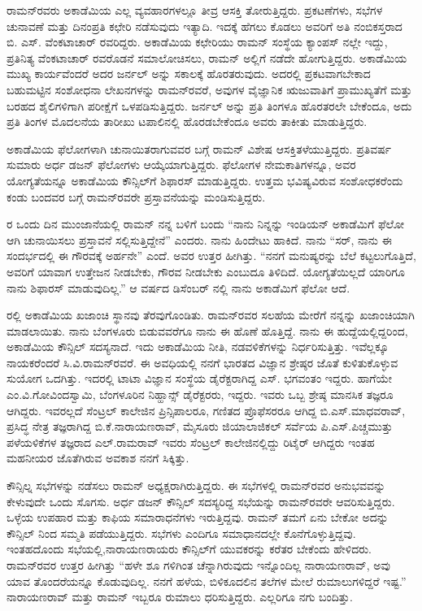 ರಾಮನ್‍ರವರು ಅಕಾಡೆಮಿಯ ಎಲ್ಲ ವ್ಯವಹಾರಗಳಲ್ಲೂ ತೀವ್ರ ಆಸಕ್ತಿ ತೋರುತ್ತಿದ್ದರು. ಪ್ರಕಟಣೆಗಳು, ಸಭೆಗಳ ಚುನಾವಣೆ ಮತ್ತು ದಿನಂಪ್ರತಿ ಕಛೇರಿ ನಡೆಸುವುದು ಇತ್ಯಾದಿ. ಇದಕ್ಕೆ ಹೆಗಲು ಕೊಡಲು ಅವರಿಗೆ ಅತಿ ನಂಬಿಕಸ್ತರಾದ ಬಿ. ಎಸ್. ವೆಂಕಟಾಚಾರ್ ರವರಿದ್ದರು. ಅಕಾಡೆಮಿಯ ಕಛೇರಿಯು ರಾಮನ್ ಸಂಸ್ಥೆಯ ಕ್ಯಾಂಪಸ್ ನಲ್ಲೇ ಇದ್ದು, ಪ್ರತಿನಿತ್ಯ ವೆಂಕಟಾಚಾರ್ ರವರೊಡನೆ ಸಮಾಲೋಚಿಸಲು, ರಾಮನ್ ಅಲ್ಲಿಗೆ ನಡೆದೇ ಹೋಗುತ್ತಿದ್ದರು. ಅಕಾಡೆಮಿಯ ಮುಖ್ಯ ಕಾರ್ಯವೆಂದರೆ ಅದರ ಜರ್ನಲ್  ಅನ್ನು ಸಕಾಲಕ್ಕೆ ಹೊರತರುವುದು. ಅದರಲ್ಲಿ ಪ್ರಕಟವಾಗಬೇಕಾದ ಬಹುಮಟ್ಟಿನ ಸಂಶೋಧನಾ ಲೇಖನಗಳನ್ನು ರಾಮನ್‍ರವರೆ, ಅವುಗಳ ವೈಜ್ಞಾನಿಕ ಋಜುವಾತಿಗೆ ಪ್ರಾಮುಖ್ಯತೆಗೆ ಮತ್ತು ಬರಹದ ಶೈಲಿಗಳಿಗಾಗಿ ಪರೀಕ್ಷೆಗೆ ಒಳಪಡಿಸುತ್ತಿದ್ದರು. ಜರ್ನಲ್ ಅನ್ನು ಪ್ರತಿ ತಿಂಗಳೂ ಹೊರತರಲೇ ಬೇಕೆಂದೂ, ಅದು ಪ್ರತಿ ತಿಂಗಳ ಮೊದಲನೆಯ ತಾರೀಖು ಟಪಾಲಿನಲ್ಲಿ ಹೊರಡಬೇಕೆಂದೂ ಅವರು ತಾಕೀತು ಮಾಡುತ್ತಿದ್ದರು.

ಅಕಾಡೆಮಿಯ ಫೆಲೋಗಳಾಗಿ ಚುನಾಯಿತರಾಗುವವರ ಬಗ್ಗೆ ರಾಮನ್ ವಿಶೇಷ ಆಸಕ್ತಿ\break ತಳೆಯುತ್ತಿದ್ದರು. ಪ್ರತಿವರ್ಷ ಸುಮಾರು ಅರ್ಧ ಡಜನ್ ಫೆಲೋಗಳು ಆಯ್ಕೆಯಾಗುತ್ತಿದ್ದರು. ಫೆಲೋಗಳ ನೇಮಕಾತಿಗಳನ್ನೂ, ಅವರ ಯೋಗ್ಯತೆಯನ್ನೂ ಅಕಾಡೆಮಿಯ ಕೌನ್ಸಿಲ್‍ಗೆ ಶಿಫಾರಸ್ ಮಾಡುತ್ತಿದ್ದರು. ಉತ್ತಮ ಭವಿಷ್ಯವಿರುವ ಸಂಶೋಧಕರೆಂದು ಕಂಡು ಬಂದವರ ಬಗ್ಗೆ ರಾಮನ್‍ರವರೇ ಪ್ರಸ್ತಾವನೆಯನ್ನು ಮಂಡಿಸುತ್ತಿದ್ದರು.

ರ ಒಂದು ದಿನ ಮುಂಜಾನೆಯಲ್ಲಿ ರಾಮನ್ ನನ್ನ ಬಳಿಗೆ ಬಂದು \enginline{-} “ನಾನು ನಿನ್ನನ್ನು ಇಂಡಿಯನ್ ಅಕಾಡೆಮಿಗೆ ಫೆಲೋ ಆಗಿ ಚುನಾಯಿಸಲು ಪ್ರಸ್ತಾವನೆ ಸಲ್ಲಿಸುತ್ತಿದ್ದೇನೆ” ಎಂದರು. ನಾನು ಹಿಂದೇಟು ಹಾಕಿದೆ. ನಾನು “ಸರ್, ನಾನು ಈ ಸಂದರ್ಭದಲ್ಲಿ ಈ ಗೌರವಕ್ಕೆ ಅರ್ಹನೇ” ಎಂದೆ. ಅವರ ಉತ್ತರ ಹೀಗಿತ್ತು. \enginline{-} “ನನಗೆ ಮನುಷ್ಯರನ್ನು ಬೆಲೆ ಕಟ್ಟಲುಗೊತ್ತಿದೆ, ಅವರಿಗೆ ಯಾವಾಗ ಉತ್ತೇಜನ ನೀಡಬೇಕು, ಗೌರವ ನೀಡಬೇಕು ಎಂಬುದೂ ತಿಳಿದಿದೆ. ಯೋಗ್ಯತೆಯಿಲ್ಲದೆ ಯಾರಿಗೂ ನಾನು ಶಿಫಾರಸ್ ಮಾಡುವುದಿಲ್ಲ.” ಆ ವರ್ಷದ ಡಿಸೆಂಬರ್ ನಲ್ಲಿ ನಾನು ಅಕಾಡೆಮಿಗೆ ಫೆಲೋ ಆದೆ.

ರಲ್ಲಿ ಅಕಾಡೆಮಿಯ ಖಜಾಂಚಿ ಸ್ಥಾನವು ತೆರವುಗೊಂಡಿತು. ರಾಮನ್‍ರವರ ಸಲಹೆಯ ಮೇರೆಗೆ ನನ್ನನ್ನು ಖಜಾಂಚಿಯಾಗಿ ಮಾಡಲಾಯಿತು. ನಾನು ಬೆಂಗಳೂರು ಬಿಡುವವರೆಗೂ ನಾನು ಈ ಹೊಣೆ ಹೊತ್ತಿದ್ದೆ. ನಾನು ಈ ಹುದ್ದೆಯಲ್ಲಿದ್ದರಿಂದ, ಅಕಾಡೆಮಿಯ ಕೌನ್ಸಿಲ್ ಸದಸ್ಯನಾದೆ. ಇದು ಅಕಾಡೆಮಿಯ ನೀತಿ, ನಡವಳಿಕೆಗಳನ್ನು ನಿರ್ಧರಿಸುತ್ತಿತ್ತು. ಇವೆಲ್ಲಕ್ಕೂ ನಾಯಕರೆಂದರೆ ಸಿ.ವಿ.ರಾಮನ್‍ರವರೆ. ಈ ಅವಧಿಯಲ್ಲಿ ನನಗೆ ಭಾರತದ ವಿಜ್ಞಾನ ಶ್ರೇಷ್ಠರ ಜೊತೆ ಕುಳಿತುಕೊಳ್ಳುವ ಸುಯೋಗ ಒದಗಿತ್ತು. ಇದರಲ್ಲಿ ಟಾಟಾ ವಿಜ್ಞಾನ ಸಂಸ್ಥೆಯ ಡೈರೆಕ್ಟರಾಗಿದ್ದ ಎಸ್. ಭಗವಂತಂ ಇದ್ದರು. ಹಾಗೆಯೇ ಎಂ.ವಿ.ಗೋವಿಂದಸ್ವಾಮಿ, ಬೆಂಗಳೂರಿನ ನಿಹ್ಹಾನ್ಸ್ ಡೈರೆಕ್ಟರರು, ಇದ್ದರು. ಇವರು ಒಬ್ಬ ಶ್ರೇಷ್ಠ ಮಾನಸಿಕ ತಜ್ಞರೂ ಆಗಿದ್ದರು. ಇವರಲ್ಲದೆ ಸೆಂಟ್ರಲ್ ಕಾಲೇಜಿನ ಪ್ರಿನ್ಸಿಪಾಲರೂ, ಗಣಿತದ ಪ್ರೊಫೆಸರರೂ ಆಗಿದ್ದ ಬಿ.ಎಸ್.ಮಾಧವರಾವ್, ಪ್ರಸಿದ್ಧ ನೇತ್ರ ತಜ್ಞರಾಗಿದ್ದ ಬಿ.ಕೆ.ನಾರಾಯಣರಾವ್, ಮೈಸೂರು ಜಿಯಾಲಾಜಿಕಲ್ ಸರ್ವೆಯ ಪಿ.ಎಸ್.ಪಿಚ್ಚಮುತ್ತು ಪಳೆಯಳಿಕೆಗಳ ತಜ್ಞರಾದ ಎಲ್.ರಾಮರಾವ್ ಇವರು ಸೆಂಟ್ರಲ್ ಕಾಲೇಜಿನಲ್ಲಿದ್ದು ರಿಟೈರ್ ಆಗಿದ್ದರು\enginline{-} ಇಂತಹ ಮಹನೀಯರ ಜೊತೆಗಿರುವ ಅವಕಾಶ ನನಗೆ ಸಿಕ್ಕಿತ್ತು.

\vskip 2pt

ಕೌನ್ಸಿಲ್ನ ಸಭೆಗಳನ್ನು ನಡೆಸಲು ರಾಮನ್ ಅಧ್ಯಕ್ಷರಾಗಿರುತ್ತಿದ್ದರು. ಈ ಸಭೆಗಳಲ್ಲಿ ರಾಮನ್‍ರವರ ಅನುಭವವನ್ನು ಕೇಳುವುದೇ ಒಂದು ಸೊಗಸು. ಅರ್ಧ ಡಜನ್ ಕೌನ್ಸಿಲ್ ಸದಸ್ಯರಿದ್ದ ಸಭೆಯನ್ನು ರಾಮನ್‍ರವರೇ ಆವರಿಸುತ್ತಿದ್ದರು. ಒಳ್ಳೆಯ ಉಪಹಾರ ಮತ್ತು ಕಾಫಿಯ ಸಮಾರಾಧನೆಗಳು ಇರುತ್ತಿದ್ದವು. ರಾಮನ್ ತಮಗೆ ಏನು ಬೇಕೋ ಅದನ್ನು ಕೌನ್ಸಿಲ್ ನಿಂದ ಸಮ್ಮತಿ ಪಡೆಯುತ್ತಿದ್ದರು. ಸಭೆಗಳು ಎಂದಿಗೂ ಸಮಾಧಾನದಲ್ಲೇ ಕೊನೆಗೊಳ್ಳುತ್ತಿದ್ದವು. ಇಂತಹದೊಂದು ಸಭೆಯಲ್ಲಿ,\break ನಾರಾಯಣರಾಯರು ಕೌನ್ಸಿಲ್‍ಗೆ ಯುವಕರನ್ನು ಕರೆತರ ಬೇಕೆಂದು ಹೇಳಿದರು. ರಾಮನ್‍ರವರ ಉತ್ತರ ಹೀಗಿತ್ತು\enginline{-} “ಹಳೇ ಶೂ ಗಳಿಗಿಂತ ಚೆನ್ನಾಗಿರುವುದು ಇನ್ನೊಂದಿಲ್ಲ ನಾರಾಯಣರಾವ್, ಅವು ಯಾವ ತೊಂದರೆಯನ್ನೂ ಕೊಡುವುದಿಲ್ಲ. ನನಗೆ ಹಳೆಯ, ಬಿಳಿಕೂದಲಿನ ತಲೆಗಳ ಮೇಲೆ ರುಮಾಲುಗಳಿದ್ದರೆ ಇಷ್ಟ.” ನಾರಾಯಣರಾವ್ ಮತ್ತು ರಾಮನ್ ಇಬ್ಬರೂ ರುಮಾಲು ಧರಿಸುತ್ತಿದ್ದರು. ಎಲ್ಲರಿಗೂ ನಗು ಬಂದಿತ್ತು.

